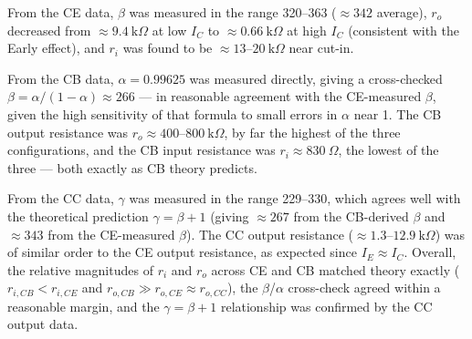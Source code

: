 \documentclass[12pt,a4paper]{article}
\begin{document}
From the CE data, $\beta$ was measured in the range 320--363 ($\approx342$ average), $r_o$ decreased
from $\approx9.4\ \text{k}\Omega$ at low $I_C$ to $\approx0.66\ \text{k}\Omega$ at high $I_C$ (consistent
with the Early effect), and $r_i$ was found to be $\approx13$--$20\ \text{k}\Omega$ near cut-in.

From the CB data, $\alpha=0.99625$ was measured directly, giving a cross-checked
$\beta=\alpha/(1-\alpha)\approx266$ — in reasonable agreement with the CE-measured $\beta$, given the
high sensitivity of that formula to small errors in $\alpha$ near 1. The CB output resistance was
$r_o\approx400$--$800\ \text{k}\Omega$, by far the highest of the three configurations, and the CB input
resistance was $r_i\approx830\ \Omega$, the lowest of the three — both exactly as CB theory predicts.

From the CC data, $\gamma$ was measured in the range 229--330, which agrees well with the theoretical
prediction $\gamma=\beta+1$ (giving $\approx267$ from the CB-derived $\beta$ and $\approx343$ from the
CE-measured $\beta$). The CC output resistance ($\approx1.3$--$12.9\ \text{k}\Omega$) was of similar
order to the CE output resistance, as expected since $I_E\approx I_C$. 
Overall, the relative magnitudes of $r_i$ and $r_o$ across CE and CB matched theory exactly
($r_{i,CB}<r_{i,CE}$ and $r_{o,CB}\gg r_{o,CE}\approx r_{o,CC}$), the $\beta$/$\alpha$ cross-check agreed
within a reasonable margin, and the $\gamma=\beta+1$ relationship was confirmed by the CC output data.
\end{document}
